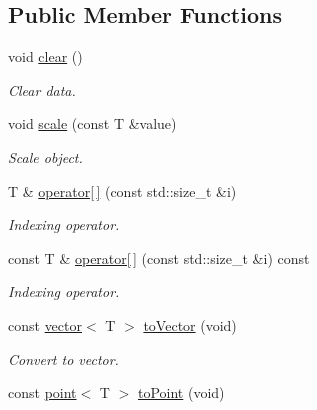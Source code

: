 \subsection*{Public Member Functions}
\begin{DoxyCompactItemize}
\item 
\mbox{\label{classddd_1_1row_object_a1da634f01207c96a25d5d53a74619afe}} 
void \hyperlink{classddd_1_1row_object_a1da634f01207c96a25d5d53a74619afe}{clear} ()
\begin{DoxyCompactList}\small\item\em Clear data. \end{DoxyCompactList}\item 
void \hyperlink{classddd_1_1row_object_a6c87f5fadb3b725f6c52cb08aed98eb2}{scale} (const T \&value)
\begin{DoxyCompactList}\small\item\em Scale object. \end{DoxyCompactList}\item 
T \& \hyperlink{classddd_1_1row_object_aff4fdb32f8b837e224b26de2bcecc7d2}{operator\mbox{[}$\,$\mbox{]}} (const std\+::size\+\_\+t \&i)
\begin{DoxyCompactList}\small\item\em Indexing operator. \end{DoxyCompactList}\item 
const T \& \hyperlink{classddd_1_1row_object_a60418f8af09e6913d16b48f2cb53e826}{operator\mbox{[}$\,$\mbox{]}} (const std\+::size\+\_\+t \&i) const
\begin{DoxyCompactList}\small\item\em Indexing operator. \end{DoxyCompactList}\item 
\mbox{\label{classddd_1_1row_object_a59fbb28dfc75528f20a0032f6a7bdccd}} 
const \hyperlink{classddd_1_1vector}{vector}$<$ T $>$ \hyperlink{classddd_1_1row_object_a59fbb28dfc75528f20a0032f6a7bdccd}{to\+Vector} (void)
\begin{DoxyCompactList}\small\item\em Convert to vector. \end{DoxyCompactList}\item 
\mbox{\label{classddd_1_1row_object_a760b84053c4b923e060dae45a9284856}} 
const \hyperlink{classddd_1_1point}{point}$<$ T $>$ \hyperlink{classddd_1_1row_object_a760b84053c4b923e060dae45a9284856}{to\+Point} (void)

\end{DoxyCompactItemize}
